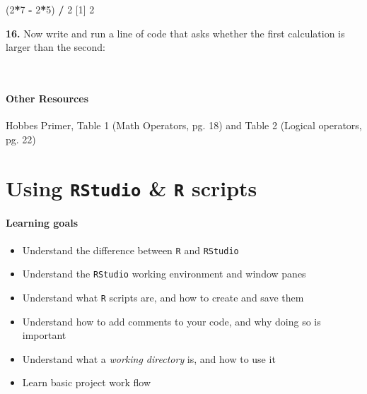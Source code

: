 \documentclass[
]{book}
\newenvironment{Shaded}{\begin{snugshade}}{\end{snugshade}}
\newcommand{\DecValTok}[1]{\textcolor[rgb]{0.00,0.00,0.81}{#1}}
\newcommand{\NormalTok}[1]{#1}
\newcommand{\OperatorTok}[1]{\textcolor[rgb]{0.81,0.36,0.00}{\textbf{#1}}}
\newcommand{\StringTok}[1]{\textcolor[rgb]{0.31,0.60,0.02}{#1}}
\providecommand{\tightlist}{%
  \setlength{\itemsep}{0pt}\setlength{\parskip}{0pt}}
\begin{document}
\begin{Shaded}
\begin{Highlighting}[]
\NormalTok{(}\DecValTok{2}\OperatorTok{*}\DecValTok{7} \OperatorTok{-}\StringTok{ }\DecValTok{2}\OperatorTok{*}\DecValTok{5}\NormalTok{) }\OperatorTok{/}\StringTok{ }\DecValTok{2}
\NormalTok{[}\DecValTok{1}\NormalTok{] }\DecValTok{2}
\end{Highlighting}
\end{Shaded}

\textbf{16.} Now write and run a line of code that asks whether the first calculation is larger than the second:

~

\hypertarget{other-resources}{%
\subsubsection*{Other Resources}\label{other-resources}}

Hobbes Primer, Table 1 (Math Operators, pg. 18) and Table 2 (Logical operators, pg. 22)

\hypertarget{using-rstudio-r-scripts}{%
\chapter{\texorpdfstring{Using \texttt{RStudio} \& \texttt{R} scripts}{Using RStudio \& R scripts}}\label{using-rstudio-r-scripts}}

\hypertarget{learning-goals-1}{%
\subsubsection*{Learning goals}\label{learning-goals-1}}

\begin{itemize}
\tightlist
\item
  Understand the difference between \texttt{R} and \texttt{RStudio}
\item
  Understand the \texttt{RStudio} working environment and window panes\\
\item
  Understand what \texttt{R} scripts are, and how to create and save them
\item
  Understand how to add comments to your code, and why doing so is important
\item
  Understand what a \emph{working directory} is, and how to use it
\item
  Learn basic project work flow
\end{itemize}
\end{document}
